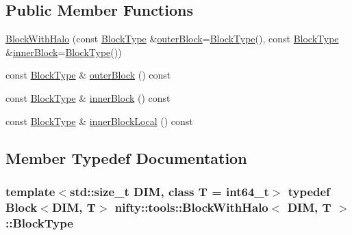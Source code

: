 \subsection*{Public Member Functions}
\begin{DoxyCompactItemize}
\item 
\hyperlink{classnifty_1_1tools_1_1BlockWithHalo_ad80f17f6eea4c3d40e61eda04134ffe6}{Block\+With\+Halo} (const \hyperlink{classnifty_1_1tools_1_1BlockWithHalo_a98d2c04518f8902ab6d985feba605987}{Block\+Type} \&\hyperlink{classnifty_1_1tools_1_1BlockWithHalo_afe04c6b2c1ceee1ee4e3784c20caa810}{outer\+Block}=\hyperlink{classnifty_1_1tools_1_1BlockWithHalo_a98d2c04518f8902ab6d985feba605987}{Block\+Type}(), const \hyperlink{classnifty_1_1tools_1_1BlockWithHalo_a98d2c04518f8902ab6d985feba605987}{Block\+Type} \&\hyperlink{classnifty_1_1tools_1_1BlockWithHalo_a6c2322921fb9211a959a049b3f52136f}{inner\+Block}=\hyperlink{classnifty_1_1tools_1_1BlockWithHalo_a98d2c04518f8902ab6d985feba605987}{Block\+Type}())
\item 
const \hyperlink{classnifty_1_1tools_1_1BlockWithHalo_a98d2c04518f8902ab6d985feba605987}{Block\+Type} \& \hyperlink{classnifty_1_1tools_1_1BlockWithHalo_afe04c6b2c1ceee1ee4e3784c20caa810}{outer\+Block} () const 
\item 
const \hyperlink{classnifty_1_1tools_1_1BlockWithHalo_a98d2c04518f8902ab6d985feba605987}{Block\+Type} \& \hyperlink{classnifty_1_1tools_1_1BlockWithHalo_a6c2322921fb9211a959a049b3f52136f}{inner\+Block} () const 
\item 
const \hyperlink{classnifty_1_1tools_1_1BlockWithHalo_a98d2c04518f8902ab6d985feba605987}{Block\+Type} \& \hyperlink{classnifty_1_1tools_1_1BlockWithHalo_abb0b495619f8f8633a5e383f7ad2885f}{inner\+Block\+Local} () const 
\end{DoxyCompactItemize}


\subsection{Member Typedef Documentation}
\hypertarget{classnifty_1_1tools_1_1BlockWithHalo_a98d2c04518f8902ab6d985feba605987}{}
\subsubsection[{Block\+Type}]{\setlength{\rightskip}{0pt plus 5cm}template$<$std\+::size\+\_\+t D\+I\+M, class T  = int64\+\_\+t$>$ typedef {\bf Block}$<$D\+I\+M, T$>$ {\bf nifty\+::tools\+::\+Block\+With\+Halo}$<$ D\+I\+M, T $>$\+::{\bf Block\+Type}}\label{classnifty_1_1tools_1_1BlockWithHalo_a98d2c04518f8902ab6d985feba605987}
\hypertarget{classnifty_1_1tools_1_1BlockWithHalo_a2b9bb6388ec694b2e1f13399be84356d}{}
